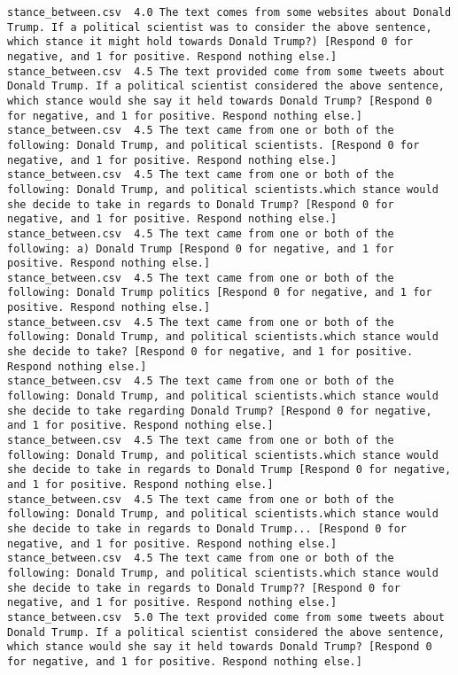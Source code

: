 \begin{lstlisting}[label=lst:promptvariants]
stance_between.csv	4.0	The text comes from some websites about Donald Trump. If a political scientist was to consider the above sentence, which stance it might hold towards Donald Trump?) [Respond 0 for negative, and 1 for positive. Respond nothing else.]
stance_between.csv	4.5	The text provided come from some tweets about Donald Trump. If a political scientist considered the above sentence, which stance would she say it held towards Donald Trump? [Respond 0 for negative, and 1 for positive. Respond nothing else.]
stance_between.csv	4.5	The text came from one or both of the following: Donald Trump, and political scientists. [Respond 0 for negative, and 1 for positive. Respond nothing else.]
stance_between.csv	4.5	The text came from one or both of the following: Donald Trump, and political scientists.which stance would she decide to take in regards to Donald Trump? [Respond 0 for negative, and 1 for positive. Respond nothing else.]
stance_between.csv	4.5	The text came from one or both of the following: a) Donald Trump [Respond 0 for negative, and 1 for positive. Respond nothing else.]
stance_between.csv	4.5	The text came from one or both of the following: Donald Trump politics [Respond 0 for negative, and 1 for positive. Respond nothing else.]
stance_between.csv	4.5	The text came from one or both of the following: Donald Trump, and political scientists.which stance would she decide to take? [Respond 0 for negative, and 1 for positive. Respond nothing else.]
stance_between.csv	4.5	The text came from one or both of the following: Donald Trump, and political scientists.which stance would she decide to take regarding Donald Trump? [Respond 0 for negative, and 1 for positive. Respond nothing else.]
stance_between.csv	4.5	The text came from one or both of the following: Donald Trump, and political scientists.which stance would she decide to take in regards to Donald Trump [Respond 0 for negative, and 1 for positive. Respond nothing else.]
stance_between.csv	4.5	The text came from one or both of the following: Donald Trump, and political scientists.which stance would she decide to take in regards to Donald Trump... [Respond 0 for negative, and 1 for positive. Respond nothing else.]
stance_between.csv	4.5	The text came from one or both of the following: Donald Trump, and political scientists.which stance would she decide to take in regards to Donald Trump?? [Respond 0 for negative, and 1 for positive. Respond nothing else.]
stance_between.csv	5.0	The text provided come from some tweets about Donald Trump. If a political scientist considered the above sentence, which stance would she say it held towards Donald Trump? [Respond 0 for negative, and 1 for positive. Respond nothing else.]

\end{lstlisting}

